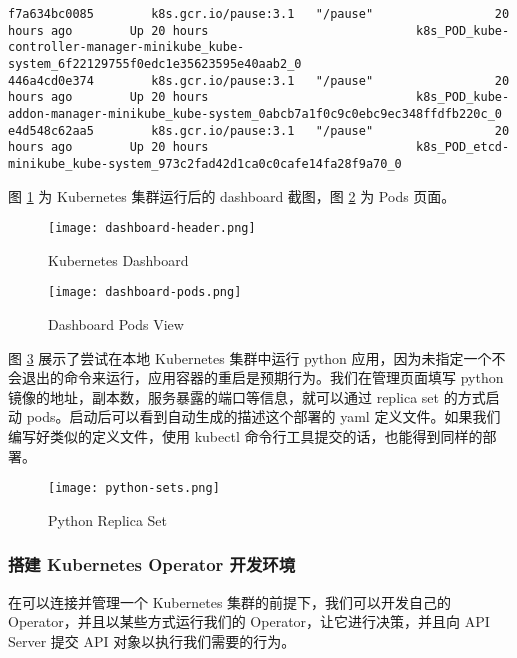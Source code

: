 \begin{lstlisting}
f7a634bc0085        k8s.gcr.io/pause:3.1   "/pause"                 20 hours ago        Up 20 hours                             k8s_POD_kube-controller-manager-minikube_kube-system_6f22129755f0edc1e35623595e40aab2_0
446a4cd0e374        k8s.gcr.io/pause:3.1   "/pause"                 20 hours ago        Up 20 hours                             k8s_POD_kube-addon-manager-minikube_kube-system_0abcb7a1f0c9c0ebc9ec348ffdfb220c_0
e4d548c62aa5        k8s.gcr.io/pause:3.1   "/pause"                 20 hours ago        Up 20 hours                             k8s_POD_etcd-minikube_kube-system_973c2fad42d1ca0c0cafe14fa28f9a70_0
\end{lstlisting}

图 \ref{fig:dashboard} 为 Kubernetes 集群运行后的 dashboard 截图，图 \ref{fig:pods} 为 Pods 页面。

\begin{figure}
    \centering
    \texttt{[image: dashboard-header.png]}
    \caption{Kubernetes Dashboard}\label{fig:dashboard}
\end{figure}

\begin{figure}
    \centering
    \texttt{[image: dashboard-pods.png]}
    \caption{Dashboard Pods View}\label{fig:pods}
\end{figure}

图 \ref{fig:python-replica} 展示了尝试在本地 Kubernetes 集群中运行 python 应用，因为未指定一个不会退出的命令来运行，应用容器的重启是预期行为。我们在管理页面填写 python 镜像的地址，副本数，服务暴露的端口等信息，就可以通过 replica set 的方式启动 pods。启动后可以看到自动生成的描述这个部署的 yaml 定义文件。如果我们编写好类似的定义文件，使用 kubectl 命令行工具提交的话，也能得到同样的部署。

\begin{figure}
    \centering
    \texttt{[image: python-sets.png]}
    \caption{Python Replica Set}\label{fig:python-replica}
\end{figure}

\subsubsection{搭建 Kubernetes Operator 开发环境}

在可以连接并管理一个 Kubernetes 集群的前提下，我们可以开发自己的 Operator，并且以某些方式运行我们的 Operator，让它进行决策，并且向 API Server 提交 API 对象以执行我们需要的行为。


